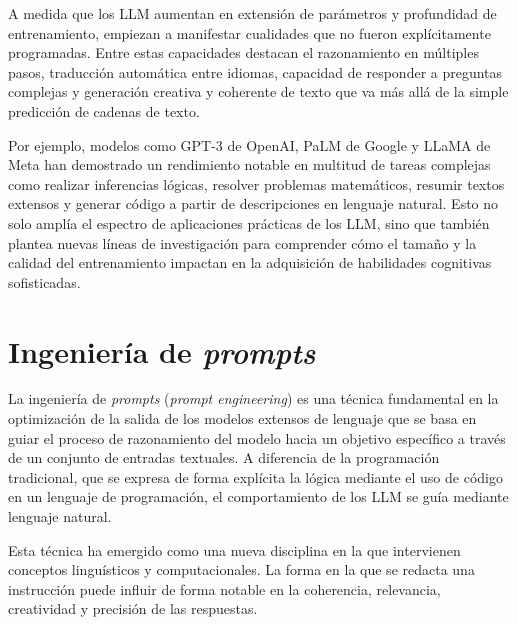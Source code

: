 A medida que los LLM aumentan en extensión de parámetros y profundidad de entrenamiento, empiezan a manifestar cualidades
que no fueron explícitamente programadas. Entre estas capacidades destacan el razonamiento en múltiples pasos,
traducción automática entre idiomas, capacidad de responder a preguntas complejas y generación creativa y coherente de texto
que va más allá de la simple predicción de cadenas de texto.

Por ejemplo, modelos como GPT-3 \cite{Brown2020GPT3} de OpenAI, PaLM \cite{chowdhery2022palm} de Google 
y LLaMA \cite{touvron2023llama} de Meta han demostrado un rendimiento notable
en multitud de tareas complejas como realizar inferencias lógicas, resolver problemas matemáticos,
resumir textos extensos y generar código a partir de descripciones en lenguaje natural.
Esto no solo amplía el espectro de aplicaciones prácticas de los LLM,
sino que también plantea nuevas líneas de investigación para comprender cómo el tamaño y
la calidad del entrenamiento impactan en la adquisición de habilidades cognitivas sofisticadas.


\section{Ingeniería de \textit{prompts}}
La ingeniería de \textit{prompts} (\textit{prompt engineering}) es una técnica fundamental en la optimización de la salida de los modelos extensos de lenguaje
que se basa en guiar el proceso de razonamiento del modelo hacia un objetivo específico a través de un conjunto de entradas textuales.
A diferencia de la programación tradicional, que se expresa de forma explícita la lógica mediante el uso de código en un lenguaje de programación,
el comportamiento de los LLM se guía mediante lenguaje natural.

Esta técnica ha emergido como una nueva disciplina en la que intervienen conceptos linguísticos y computacionales.
La forma en la que se redacta una instrucción puede influir de forma notable en la coherencia, relevancia, creatividad
y precisión de las respuestas.

